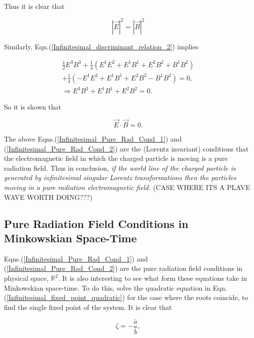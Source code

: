 \noindent Thus it is clear that

\begin{equation}\label{Infinitesimal_Pure_Rad_Cond_1}
{|\vec{E}|}^2 = {|\vec{B}|}^2
\end{equation}

\noindent Similarly, Eqn.(\ref{Infinitesimal_discriminant_relation_2}) implies

\begin{eqnarray*}
\frac{1}{2} E^3 B^3 + \frac{1}{4} (E^1E^2 + E^1B^1 + E^2B^2 + B^1B^2) \\
 +  \frac{1}{4} (-E^1E^2 + E^1B^1 + E^2B^2 - B^1B^2) = 0, \\
\Rightarrow E^3B^3 + E^1B^1 + E^2B^2 = 0.
\end{eqnarray*}

\noindent So it is shown that

\begin{equation}\label{Infinitesimal_Pure_Rad_Cond_2}
\vec{E} \cdot \vec{B} = 0.
\end{equation}

\noindent The above Eqns.(\ref{Infinitesimal_Pure_Rad_Cond_1}) and (\ref{Infinitesimal_Pure_Rad_Cond_2}) are the (Lorentz invariant) conditions that the electromagnetic field in which the charged particle is moving is a pure radiation field. Thus in conclusion, \textit{if the world line of the charged particle is generated by infinitesimal singular Lorentz transformations then the particles moving in a pure radiation electromagnetic field.} (CASE WHERE ITS A PLAVE WAVE WORTH DOING???)

\subsection{Pure Radiation Field Conditions in Minkowskian Space-Time}

Eqns.(\ref{Infinitesimal_Pure_Rad_Cond_1}) and (\ref{Infinitesimal_Pure_Rad_Cond_2}) are the pure radiation field conditions in physical space, ${\mathbb{R}}^2$. It is also interesting to see what form these equations take in Minkowskian space-time. To do this, solve the quadratic equation in Eqn.(\ref{Infinitesimal_fixed_point_quadratic}) for the case where the roots coincide, to find the single fixed point of the system. It is clear that 

\begin{equation}\label{Infinitesimal_Zeta_Fixed_Point}
\zeta = - \frac{\bar{a}}{\bar{b}},
\end{equation}

